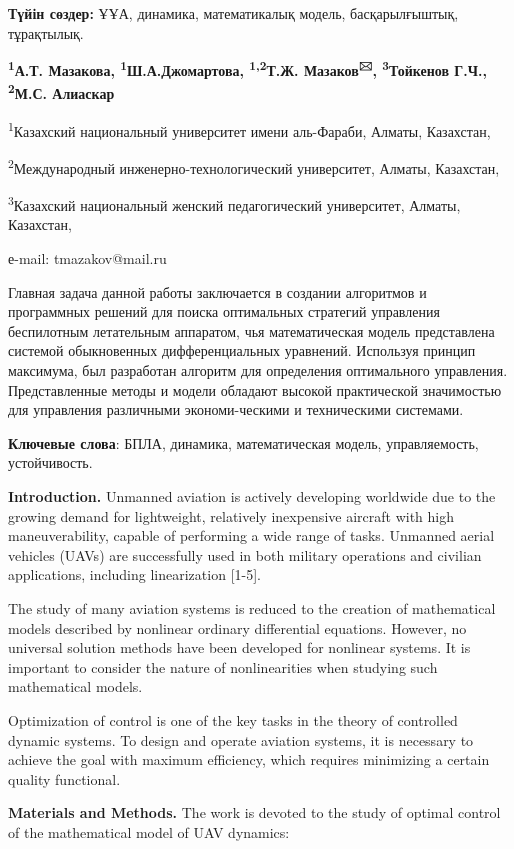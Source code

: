 {\bfseries Түйін сөздер:} ҰҰА, динамика, математикалық модель,
басқарылғыштық, тұрақтылық.


\begin{center}
{\bfseries \textsuperscript{1}А.Т. Мазакова,
\textsuperscript{1}Ш.А.Джомартова, \textsuperscript{1,2}Т.Ж.
Мазаков\textsuperscript{🖂}, \textsuperscript{3}Тойкенов Г.Ч., \textsuperscript{2}М.С. Алиаскар}

\textsuperscript{1}Казахский национальный университет имени аль-Фараби,
Алматы, Казахстан,

\textsuperscript{2}Международный инженерно-технологический университет,
Алматы, Казахстан,

\textsuperscript{3}Казахский национальный женский педагогический
университет, Алматы, Казахстан,

е-mail: tmazakov@mail.ru
\end{center}

Главная задача данной работы заключается в создании алгоритмов и
программных решений для поиска оптимальных стратегий управления
беспилотным летательным аппаратом, чья математическая модель
представлена системой обыкновенных дифференциальных уравнений. Используя
принцип максимума, был разработан алгоритм для определения оптимального
управления. Представленные методы и модели обладают высокой практической
значимостью для управления различными экономи-ческими и техническими
системами.

{\bfseries Ключевые слова}: БПЛА, динамика, математическая модель,
управляемость, устойчивость.
\begin{multicols}{2}

{\bfseries Introduction.} Unmanned aviation is actively developing
worldwide due to the growing demand for lightweight, relatively
inexpensive aircraft with high maneuverability, capable of performing a
wide range of tasks. Unmanned aerial vehicles (UAVs) are successfully
used in both military operations and civilian applications, including
linearization {[}1-5{]}.

The study of many aviation systems is reduced to the creation of
mathematical models described by nonlinear ordinary differential
equations. However, no universal solution methods have been developed
for nonlinear systems. It is important to consider the nature of
nonlinearities when studying such mathematical models.

Optimization of control is one of the key tasks in the theory of
controlled dynamic systems. To design and operate aviation systems, it
is necessary to achieve the goal with maximum efficiency, which requires
minimizing a certain quality functional.

{\bfseries Materials and Methods.} The work is devoted to the study of
optimal control of the mathematical model of UAV dynamics:
\end{multicols}

